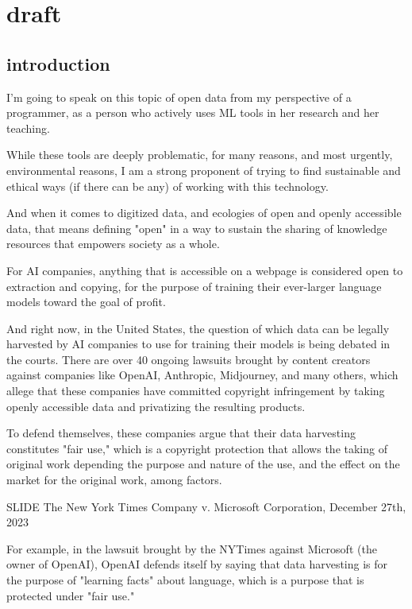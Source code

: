 \documentclass[11pt]{article}
\author{fcalado}
\date{\today}
\title{}
\begin{document}
\tableofcontents

\section{draft}
\label{sec:org708d747}

\subsection{introduction}
\label{sec:orgd4b6d8b}
I'm going to speak on this topic of open data from my perspective of a
programmer, as a person who actively uses ML tools in her research and
her teaching.

While these tools are deeply problematic, for many reasons, and most
urgently, environmental reasons, I am a strong proponent of trying to
find sustainable and ethical ways (if there can be any) of working
with this technology.

And when it comes to digitized data, and ecologies of open and openly
accessible data, that means defining "open" in a way to sustain the
sharing of knowledge resources that empowers society as a whole.

For AI companies, anything that is accessible on a webpage is
considered open to extraction and copying, for the purpose of training
their ever-larger language models toward the goal of profit.

And right now, in the United States, the question of which data can be
legally harvested by AI companies to use for training their models is
being debated in the courts. There are over 40 ongoing lawsuits
brought by content creators against companies like OpenAI, Anthropic,
Midjourney, and many others, which allege that these companies have
committed copyright infringement by taking openly accessible data and
privatizing the resulting products.

To defend themselves, these companies argue that their data harvesting
constitutes "fair use," which is a copyright protection that allows
the taking of original work depending the purpose and nature of the
use, and the effect on the market for the original work, among
factors.

SLIDE The New York Times Company v. Microsoft Corporation,
December 27th, 2023 

For example, in the lawsuit brought by the NYTimes against Microsoft
(the owner of OpenAI), OpenAI defends itself by saying that data
harvesting is for the purpose of "learning facts" about language,
which is a purpose that is protected under "fair use."
\end{document}
